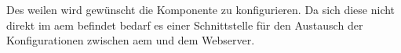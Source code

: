 Des weilen wird gewünscht die Komponente zu konfigurieren. Da sich diese nicht direkt im \ac{aem} befindet bedarf es einer Schnittstelle für den Austausch der Konfigurationen zwischen \ac{aem} und dem Webserver.
\missingtext